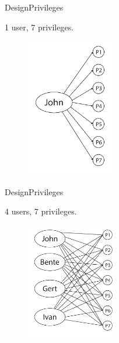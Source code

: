 \begin{frame}{Design}{Privileges}
  \begin{block}{}
  	1 user, 7 privileges.

  	\begin{figure}[htb]
    	\centering
    	\includegraphics[width=0.35\textwidth]{images/privileges1.pdf}
  	\end{figure}
  \end{block}
\end{frame}

\begin{frame}{Design}{Privileges}
  \begin{block}{}
  	4 users, 7 privileges. 

  	\begin{figure}[htb]
    	\centering
    	\includegraphics[width=0.35\textwidth]{images/privileges2.pdf}
  	\end{figure}
  \end{block}
\end{frame}

